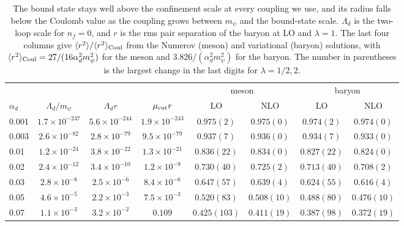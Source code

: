 \begin{table}[t]
\centering
\begin{tabular}{lccc|cc|cc}
\hline\hline
& & & & \multicolumn{2}{c|}{meson} & \multicolumn{2}{c}{baryon}\\
$\alpha_d$ & $\Lambda_d/m_\psi$ & $\Lambda_d r$ & $\mu_{\rm cut}r$ & LO & NLO & LO & NLO\\
\hline
0.001 & $1.7\times10^{-247}$ & $5.6\times10^{-244}$ & $1.9\times10^{-243}$ & $0.975(2)$ & $0.975(0)$ & $0.974(2)$ & $0.974(0)$\\
0.003 & $2.6\times10^{-82}$ & $2.8\times10^{-79}$ & $9.5\times10^{-79}$ & $0.937(7)$ & $0.936(0)$ & $0.934(7)$ & $0.933(0)$\\
0.01 & $1.2\times10^{-24}$ & $3.8\times10^{-22}$ & $1.3\times10^{-21}$ & $0.836(22)$ & $0.834(0)$ & $0.827(22)$ & $0.824(0)$\\
0.02 & $2.4\times10^{-12}$ & $3.4\times10^{-10}$ & $1.2\times10^{-9}$ & $0.730(40)$ & $0.725(2)$ & $0.713(40)$ & $0.708(2)$\\
0.03 & $2.8\times10^{-8}$ & $2.5\times10^{-6}$ & $8.4\times10^{-6}$ & $0.647(57)$ & $0.639(4)$ & $0.624(55)$ & $0.616(4)$\\
0.05 & $4.6\times10^{-5}$ & $2.2\times10^{-3}$ & $7.5\times10^{-3}$ & $0.520(83)$ & $0.508(10)$ & $0.488(80)$ & $0.476(10)$\\
0.07 & $1.1\times10^{-3}$ & $3.2\times10^{-2}$ & $0.109$ & $0.425(103)$ & $0.411(19)$ & $0.387(98)$ & $0.372(19)$\\
\hline\hline
\end{tabular}
\caption{The bound state stays well above the confinement scale at every coupling we use, and its radius falls below
the Coulomb value as the coupling grows between $m_\psi$ and the bound-state scale.
$\Lambda_d$ is the two-loop scale for $n_f=0$, and $r$ is the rms pair separation of the baryon at LO and $\lambda=1$.
The last four columns give $\langle r^2\rangle/\langle r^2\rangle_{\rm Coul}$ from the Numerov (meson) and variational (baryon)
solutions, with $\langle r^2\rangle_{\rm Coul}=27/(16\alpha_d^2m_\psi^2)$ for the meson and $3.826/(\alpha_d^2m_\psi^2)$ for the baryon.
The number in parentheses is the largest change in the last digits for $\lambda=1/2,2$.}
\label{tab:smallalpha}
\end{table}
